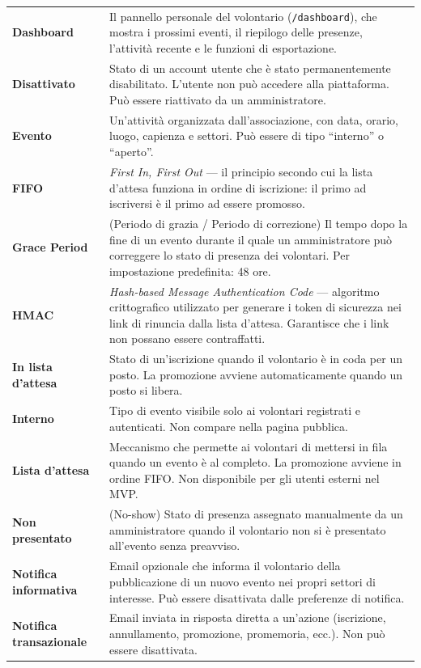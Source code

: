 \documentclass[a4paper,11pt,oneside]{book}
\newcommand{\percorso}[1]{\textcolor{namoCyan}{\texttt{#1}}}
\begin{document}
\begin{longtable}{l p{10cm}}
\textbf{Dashboard} & Il pannello personale del volontario (\percorso{/dashboard}), che mostra i prossimi eventi, il riepilogo delle presenze, l'attivit\`a recente e le funzioni di esportazione. \\[4pt]
\textbf{Disattivato} & Stato di un account utente che \`e stato permanentemente disabilitato. L'utente non pu\`o accedere alla piattaforma. Pu\`o essere riattivato da un amministratore. \\[4pt]
\textbf{Evento} & Un'attivit\`a organizzata dall'associazione, con data, orario, luogo, capienza e settori. Pu\`o essere di tipo ``interno'' o ``aperto''. \\[4pt]
\textbf{FIFO} & \textit{First In, First Out} --- il principio secondo cui la lista d'attesa funziona in ordine di iscrizione: il primo ad iscriversi \`e il primo ad essere promosso. \\[4pt]
\textbf{Grace Period} & (Periodo di grazia / Periodo di correzione) Il tempo dopo la fine di un evento durante il quale un amministratore pu\`o correggere lo stato di presenza dei volontari. Per impostazione predefinita: 48 ore. \\[4pt]
\textbf{HMAC} & \textit{Hash-based Message Authentication Code} --- algoritmo crittografico utilizzato per generare i token di sicurezza nei link di rinuncia dalla lista d'attesa. Garantisce che i link non possano essere contraffatti. \\[4pt]
\textbf{In lista d'attesa} & Stato di un'iscrizione quando il volontario \`e in coda per un posto. La promozione avviene automaticamente quando un posto si libera. \\[4pt]
\textbf{Interno} & Tipo di evento visibile solo ai volontari registrati e autenticati. Non compare nella pagina pubblica. \\[4pt]
\textbf{Lista d'attesa} & Meccanismo che permette ai volontari di mettersi in fila quando un evento \`e al completo. La promozione avviene in ordine FIFO. Non disponibile per gli utenti esterni nel MVP. \\[4pt]
\textbf{Non presentato} & (No-show) Stato di presenza assegnato manualmente da un amministratore quando il volontario non si \`e presentato all'evento senza preavviso. \\[4pt]
\textbf{Notifica informativa} & Email opzionale che informa il volontario della pubblicazione di un nuovo evento nei propri settori di interesse. Pu\`o essere disattivata dalle preferenze di notifica. \\[4pt]
\textbf{Notifica transazionale} & Email inviata in risposta diretta a un'azione (iscrizione, annullamento, promozione, promemoria, ecc.). Non pu\`o essere disattivata. \\[4pt]

\end{longtable}
\end{document}
